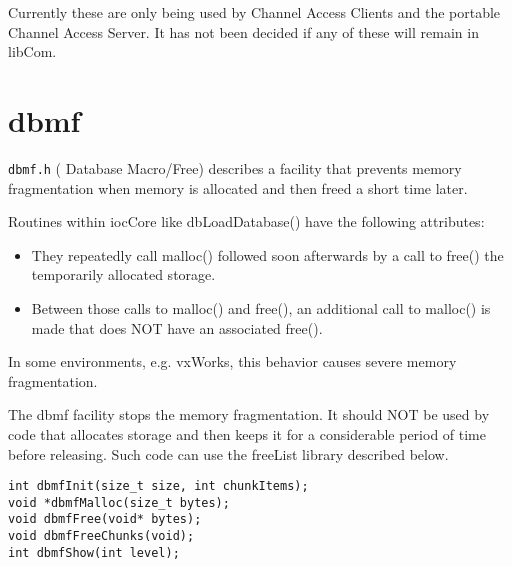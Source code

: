 Currently these are only being used by Channel Access Clients and the portable Channel Access Server. It has not been 
decided if any of these will remain in libCom.

\section{dbmf}

 \verb|dbmf.h| ( Database Macro/Free) describes a facility that prevents memory fragmentation when memory is allocated and 
then freed a short time later.

Routines within iocCore like dbLoadDatabase() have the following attributes:

\begin{itemize}
\item They repeatedly call malloc() followed soon afterwards by a call to free() the temporarily allocated storage.

\item Between those calls to malloc() and free(), an additional call to malloc() is made that does NOT have an associated 
free().

\end{itemize}

In some environments, e.g. vxWorks, this behavior causes severe memory fragmentation.

The dbmf facility stops the memory fragmentation. It should NOT be used by code that allocates storage and then keeps it 
for a considerable period of time before releasing. Such code can use the freeList library described below.

\begin{verbatim}
int dbmfInit(size_t size, int chunkItems);
void *dbmfMalloc(size_t bytes);
void dbmfFree(void* bytes);
void dbmfFreeChunks(void);
int dbmfShow(int level);
\end{verbatim}

